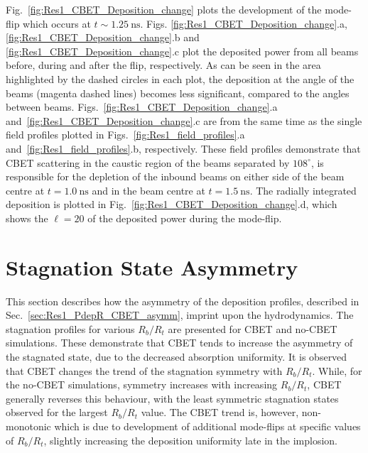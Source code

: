 Fig.~\ref{fig:Res1_CBET_Deposition_change} plots the development of the mode-flip which occurs at $t\sim 1.25\ \text{ns}$.
Figs. \ref{fig:Res1_CBET_Deposition_change}.a, \ref{fig:Res1_CBET_Deposition_change}.b and \ref{fig:Res1_CBET_Deposition_change}.c plot the deposited power from all beams before, during and after the flip, respectively.
As can be seen in the area highlighted by the dashed circles in each plot, the deposition at the angle of the beams (magenta dashed lines) becomes less significant, compared to the angles between beams.
Figs.~\ref{fig:Res1_CBET_Deposition_change}.a and~\ref{fig:Res1_CBET_Deposition_change}.c are from the same time as the single field profiles plotted in Figs.~\ref{fig:Res1_field_profiles}.a and~\ref{fig:Res1_field_profiles}.b, respectively.
These field profiles demonstrate that \ac{CBET} scattering in the caustic region of the beams separated by $108^{\circ}$, is responsible for the depletion of the inbound beams on either side of the beam centre at $t=1.0\ \text{ns}$ and in the beam centre at $t=1.5\ \text{ns}$.
The radially integrated deposition is plotted in Fig.~\ref{fig:Res1_CBET_Deposition_change}.d, which shows the $\ell=20$ of the deposited power during the mode-flip.

\section{Stagnation State Asymmetry}%
\label{sec:Res1_StagnationAsymm}

This section describes how the asymmetry of the deposition profiles, described in Sec.~\ref{sec:Res1_PdepR_CBET_asymm}, imprint upon the hydrodynamics.
The stagnation profiles for various $R_b/R_t$ are presented for \ac{CBET} and no-\ac{CBET} simulations.
These demonstrate that \ac{CBET} tends to increase the asymmetry of the stagnated state, due to the decreased absorption uniformity.
It is observed that \ac{CBET} changes the trend of the stagnation symmetry with $R_b/R_t$.
While, for the no-\ac{CBET} simulations, symmetry increases with increasing $R_b/R_t$, \ac{CBET} generally reverses this behaviour, with the least symmetric stagnation states observed for the largest $R_b/R_t$ value.
The \ac{CBET} trend is, however, non-monotonic which is due to development of additional mode-flips at specific values of $R_b/R_t$, slightly increasing the deposition uniformity late in the implosion.

